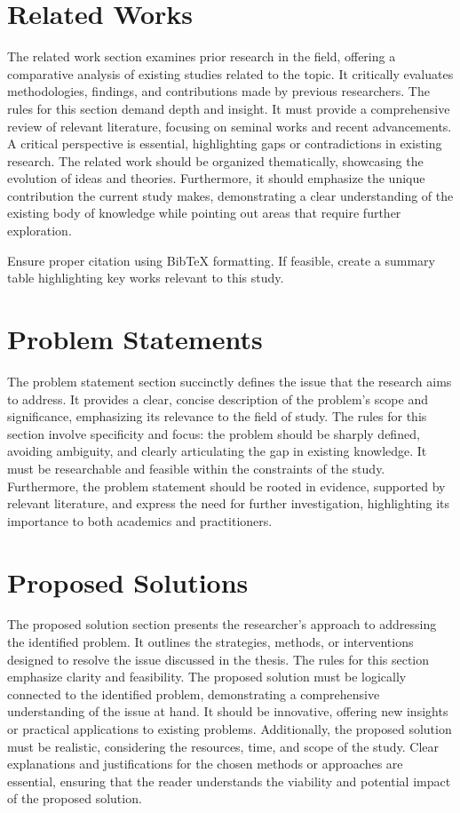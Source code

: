 %
\section{Related Works}
\label{literature:related works}
%
The related work section examines prior research in the field, offering a comparative analysis of existing studies related to the topic. It critically evaluates methodologies, findings, and contributions made by previous researchers. The rules for this section demand depth and insight. It must provide a comprehensive review of relevant literature, focusing on seminal works and recent advancements. A critical perspective is essential, highlighting gaps or contradictions in existing research. The related work should be organized thematically, showcasing the evolution of ideas and theories. Furthermore, it should emphasize the unique contribution the current study makes, demonstrating a clear understanding of the existing body of knowledge while pointing out areas that require further exploration.

Ensure proper citation using BibTeX formatting. If feasible, create a summary table highlighting key works relevant to this study.


% 
\section{Problem Statements}
\label{literature:problem}
% 
The problem statement section succinctly defines the issue that the research aims to address. It provides a clear, concise description of the problem's scope and significance, emphasizing its relevance to the field of study. The rules for this section involve specificity and focus: the problem should be sharply defined, avoiding ambiguity, and clearly articulating the gap in existing knowledge. It must be researchable and feasible within the constraints of the study. Furthermore, the problem statement should be rooted in evidence, supported by relevant literature, and express the need for further investigation, highlighting its importance to both academics and practitioners.


% 
\section{Proposed Solutions}
\label{literature:solutions}
% 
The proposed solution section presents the researcher's approach to addressing the identified problem. It outlines the strategies, methods, or interventions designed to resolve the issue discussed in the thesis. The rules for this section emphasize clarity and feasibility. The proposed solution must be logically connected to the identified problem, demonstrating a comprehensive understanding of the issue at hand. It should be innovative, offering new insights or practical applications to existing problems. Additionally, the proposed solution must be realistic, considering the resources, time, and scope of the study. Clear explanations and justifications for the chosen methods or approaches are essential, ensuring that the reader understands the viability and potential impact of the proposed solution.
